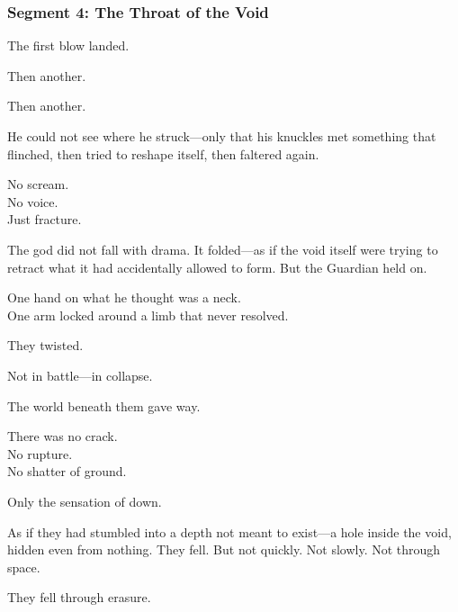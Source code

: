 \documentclass[9pt]{article}
\begin{document}
\newpage

\subsubsection*{Segment 4: The Throat of the Void}

The first blow landed.

\vspace{0.5em}
Then another.

\vspace{0.5em}
Then another.

\vspace{0.5em}
He could not see where he struck---only that his knuckles met something that flinched, then tried to reshape itself, then faltered again.

\vspace{0.5em}
No scream.\\
No voice.\\
Just fracture.

\vspace{0.5em}
The god did not fall with drama. It folded---as if the void itself were trying to retract what it had accidentally allowed to form. But the Guardian held on.

\vspace{0.5em}
One hand on what he thought was a neck.\\
One arm locked around a limb that never resolved.

\vspace{0.5em}
They twisted.

\vspace{0.5em}
Not in battle---in collapse.

\vspace{0.5em}
The world beneath them gave way.

\vspace{0.5em}
There was no crack.\\
No rupture.\\
No shatter of ground.

\vspace{0.5em}
Only the sensation of down.

\vspace{0.5em}
As if they had stumbled into a depth not meant to exist---a hole inside the void, hidden even from nothing. They fell. But not quickly. Not slowly. Not through space.

\vspace{0.5em}
They fell through erasure.
\end{document}
